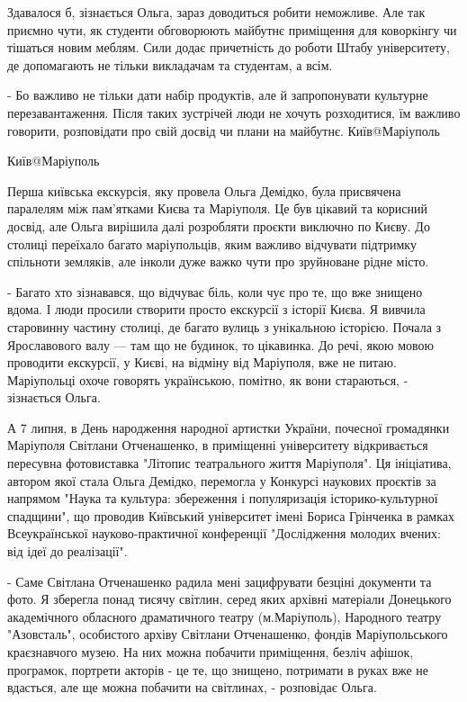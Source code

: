 Здавалося б, зізнається Ольга, зараз доводиться робити неможливе. Але так
приємно чути, як студенти обговорюють майбутнє приміщення для коворкінгу чи
тішаться новим меблям. Сили додає причетність до роботи Штабу університету, де
допомагають не тільки викладачам та студентам, а всім. 

- Бо важливо не тільки дати набір продуктів, але й запропонувати культурне
перезавантаження. Після таких зустрічей люди не хочуть розходитися, їм важливо
говорити, розповідати про свій досвід чи плани на майбутнє.  Київ@Маріуполь 

Київ@Маріуполь 

Перша київська екскурсія, яку провела Ольга Демідко, була присвячена паралелям
між пам'ятками Києва та Маріуполя. Це був цікавий та корисний досвід, але Ольга
вирішила далі розробляти проєкти виключно по Києву. До столиці переїхало багато
маріупольців, яким важливо відчувати підтримку спільноти земляків, але інколи
дуже важко чути про зруйноване рідне місто. 

- Багато хто зізнавався, що відчуває біль, коли чує про те, що вже знищено
вдома. І люди просили створити просто екскурсії з історії Києва. Я вивчила
старовинну частину столиці, де багато вулиць з унікальною історією. Почала з
Ярославового валу — там що не будинок, то цікавинка. До речі, якою мовою
проводити екскурсії, у Києві, на відміну від Маріуполя, вже не питаю.
Маріупольці охоче говорять українською, помітно, як вони стараються, -
зізнається Ольга.

А 7 липня, в День народження народної артистки України, почесної громадянки
Маріуполя Світлани Отченашенко, в приміщенні університету відкривається
пересувна фотовиставка "Літопис театрального життя Маріуполя".  Ця ініціатива,
автором якої стала Ольга Демідко, перемогла у Конкурсі наукових проєктів за
напрямом "Наука та культура: збереження і популяризація історико-культурної
спадщини", що проводив Київський університет імені Бориса Грінченка в рамках
Всеукраїнської науково-практичної конференції "Дослідження молодих вчених: від
ідеї до реалізації". 

- Саме Світлана Отченашенко радила мені зацифрувати безціні документи та фото.
Я зберегла понад тисячу світлин, серед яких архівні матеріали Донецького
академічного обласного драматичного театру (м.Маріуполь), Народного театру
"Азовсталь", особистого архіву Світлани Отченашенко, фондів Маріупольського
краєзнавчого музею. На них можна побачити приміщення, безліч афішок, програмок,
портрети акторів - це те, що знищено, потримати в руках вже не вдасться, але ще
можна побачити на світлинах, - розповідає Ольга.


